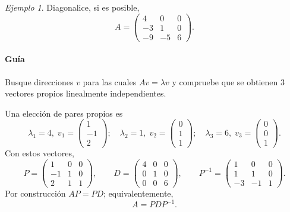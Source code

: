 \documentclass[12pt]{article}
\theoremstyle{remark}
\newtheorem{Ejem}[definicion]{Ejemplo}
\begin{document}
\begin{Ejem}

Diagonalice, si es posible,
\[
A=\begin{pmatrix}4 & 0 & 0\\-3 & 1 & 0\\-9 & -5 & 6\end{pmatrix}.
\]

\paragraph{Guía}
Busque direcciones $v$ para las cuales $Av=\lambda v$ y compruebe que se obtienen $3$ vectores propios linealmente independientes.

\scriptsize
Una elección de pares propios es
\[
\lambda_1=4,\;v_1=\begin{pmatrix}1\\-1\\2\end{pmatrix};\quad \lambda_2=1,\;v_2=\begin{pmatrix}0\\1\\1\end{pmatrix};\quad \lambda_3=6,\;v_3=\begin{pmatrix}0\\0\\1\end{pmatrix}.
\]
Con estos vectores,
\[
P=\begin{pmatrix}1 & 0 & 0\\-1 & 1 & 0\\2 & 1 & 1\end{pmatrix},\qquad D=\begin{pmatrix}4 & 0 & 0\\0 & 1 & 0\\0 & 0 & 6\end{pmatrix},\qquad P^{-1}=\begin{pmatrix}1 & 0 & 0\\1 & 1 & 0\\-3 & -1 & 1\end{pmatrix}.
\]
Por construcción $AP=PD$; equivalentemente,
\[
\boxed{A=PDP^{-1}}.
\]
\end{Ejem}
\end{document}
